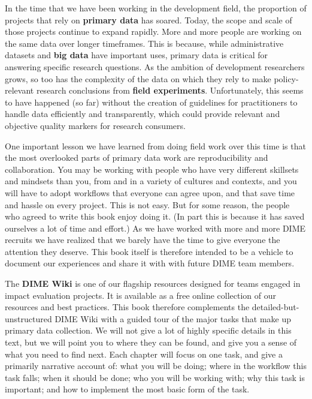 In the time that we have been working in the development field,
the proportion of projects that rely on \textbf{primary data} has soared.\cite{angrist2017economic}
Today, the scope and scale of those projects continue to expand rapidly.
More and more people are working on the same data over longer timeframes.
This is because, while administrative datasets
and \textbf{big data} have important uses,
primary data
is critical for answering specific research questions.\cite{levitt2009field}
As the ambition of development researchers grows, so too has the complexity of the data
on which they rely to make policy-relevant research conclusions from \textbf{field experiments}.
Unfortunately, this seems to have happened (so far) without the creation of
guidelines for practitioners to handle data efficiently and transparently,
which could provide relevant and objective quality markers for research consumers.

One important lesson we have learned from doing field work over this time is that
the most overlooked parts of primary data work are reproducibility and collaboration.
You may be working with people
who have very different skillsets and mindsets than you,
from and in a variety of cultures and contexts, and you will have to adopt workflows
that everyone can agree upon, and that save time and hassle on every project.
This is not easy. But for some reason, the people who agreed to write this book enjoy doing it.
(In part this is because it has saved ourselves a lot of time and effort.)
As we have worked with more and more DIME recruits
we have realized that we barely have the time to give everyone the attention they deserve.
This book itself is therefore intended to be a vehicle to document our experiences and share it with with future DIME team members.

The \textbf{DIME Wiki} is one of our flagship resources designed for teams engaged in impact evaluation projects.
It is available as a free online collection of our resources and best practices.
This book therefore complements the detailed-but-unstructured DIME Wiki
with a guided tour of the major tasks that make up primary data collection.
We will not give a lot of highly specific details in this text,
but we will point you to where they can be found,
and give you a sense of what you need to find next.
Each chapter will focus on one task,
and give a primarily narrative account of:
what you will be doing; where in the workflow this task falls;
when it should be done; who you will be working with;
why this task is important; and how to implement the most basic form of the task.

